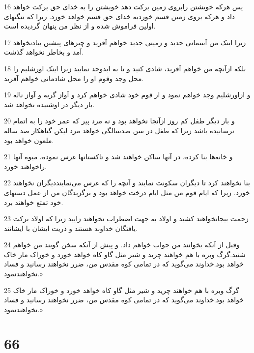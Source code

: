 \par 16 پس هرکه خویشتن رابروی زمین برکت دهد خویشتن را به خدای حق برکت خواهد داد و هرکه بروی زمین قسم خوردبه خدای حق قسم خواهد خورد. زیرا که تنگیهای اولین فراموش شده و از نظر من پنهان گردیده است.
\par 17 زیرا اینک من آسمانی جدید و زمینی جدید خواهم آفرید و چیزهای پیشین بیادنخواهد آمد و بخاطر نخواهد گذشت.
\par 18 بلکه ازآنچه من خواهم آفرید، شادی کنید و تا به ابدوجد نمایید زیرا اینک اورشلیم را محل وجد وقوم او را محل شادمانی خواهم آفرید.
\par 19 و ازاورشلیم وجد خواهم نمود و از قوم خود شادی خواهم کرد و آواز گریه و آواز ناله بار دیگر در اوشنیده نخواهد شد.
\par 20 و بار دیگر طفل کم روز ازآنجا نخواهد بود و نه مرد پیر که عمر خود را به اتمام نرسانیده باشد زیرا که طفل در سن صدسالگی خواهد مرد لیکن گناهکار صد ساله ملعون خواهد بود.
\par 21 و خانه‌ها بنا کرده، در آنها ساکن خواهند شد و تاکستانها غرس نموده، میوه آنها راخواهند خورد.
\par 22 بنا نخواهند کرد تا دیگران سکونت نمایند و آنچه را که غرس می‌نماینددیگران نخواهند خورد. زیرا که ایام قوم من مثل ایام درخت خواهد بود و برگزیدگان من از عمل دستهای خود تمتع خواهند برد.
\par 23 زحمت بیجانخواهند کشید و اولاد به جهت اضطراب نخواهند زایید زیرا که اولاد برکت یافتگان خداوند هستند و ذریت ایشان با ایشانند.
\par 24 وقبل از آنکه بخوانند من جواب خواهم داد. و پیش از آنکه سخن گویند من خواهم شنید.گرگ وبره با هم خواهند چرید و شیر مثل گاو کاه خواهد خورد و خوراک مار خاک خواهد بود.خداوند می‌گوید که در تمامی کوه مقدس من، ضرر نخواهند رسانید و فساد نخواهندنمود.»
\par 25 گرگ وبره با هم خواهند چرید و شیر مثل گاو کاه خواهد خورد و خوراک مار خاک خواهد بود.خداوند می‌گوید که در تمامی کوه مقدس من، ضرر نخواهند رسانید و فساد نخواهندنمود.»
 
\chapter{66}

